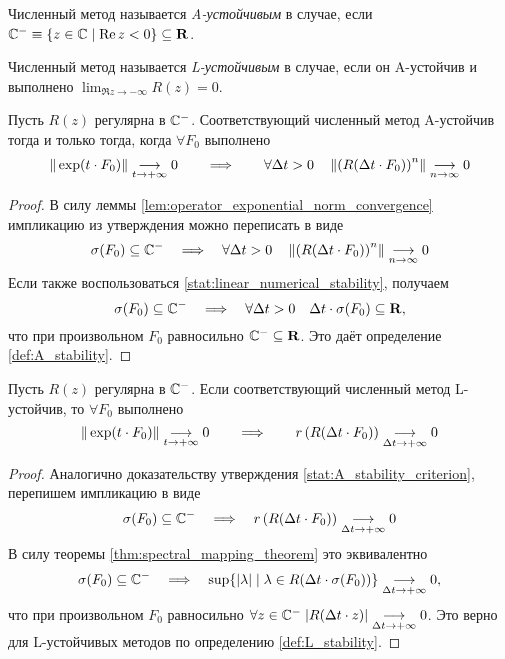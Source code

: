 \begin{definition}
    \label{def:A_stability}
    Численный метод называется \emph{A-устойчивым} в случае, если $ \mathbb{C}^- \equiv \{ z \in \mathbb{C} \mid \operatorname{Re} z < 0 \} \subseteq \mathbf{R} $.
\end{definition}

\begin{definition}
    \label{def:L_stability}
    Численный метод называется \emph{L-устойчивым} в случае, если он A-устойчив и выполнено $ \displaystyle\lim_{\Re z \to -\infty} R(z) = 0 $.
\end{definition}

\begin{statement}
    \label{stat:A_stability_criterion}
    Пусть $ R(z) $ регулярна в $ \mathbb{C}^- $.
    Соответствующий численный метод A-устойчив тогда и только тогда, когда $ \forall F_0 $ выполнено
    \[
        \| \exp(t \cdot F_0) \| \underset{t \to +\infty}{\longrightarrow} 0 \qquad \Longrightarrow \qquad \forall \Delta t > 0 \quad \left \| \left( R(\Delta t \cdot F_0) \right)^n \right\| \underset{n \to \infty}{\longrightarrow} 0
    \]
\end{statement}

\begin{proof}
    В силу леммы \ref{lem:operator_exponential_norm_convergence} импликацию из утверждения можно переписать в виде
    \[
        \sigma(F_0) \subseteq \mathbb{C}^- \quad \Longrightarrow \quad \forall \Delta t > 0 \quad \left \| \left( R(\Delta t \cdot F_0) \right)^n \right\| \underset{n \to \infty}{\longrightarrow} 0
    \]
    Если также воспользоваться \ref{stat:linear_numerical_stability}, получаем
    \[
        \sigma(F_0) \subseteq \mathbb{C}^- \quad \Longrightarrow \quad \forall \Delta t > 0 \quad \Delta t \cdot \sigma(F_0) \subseteq \mathbf{R},
    \]
    что при произвольном $ F_0 $ равносильно $ \mathbb{C}^- \subseteq \mathbf{R} $.
    Это даёт определение \ref{def:A_stability}.
\end{proof}

\begin{statement}
    \label{stat:L_stability_property}
    Пусть $ R(z) $ регулярна в $ \mathbb{C}^- $.
    Если соответствующий численный метод L-устойчив, то $ \forall F_0 $ выполнено
    \[
        \| \exp(t \cdot F_0) \| \underset{t \to +\infty}{\longrightarrow} 0 \qquad \Longrightarrow \qquad r \left( R(\Delta t \cdot F_0) \right) \underset{\Delta t \to +\infty}{\longrightarrow} 0
    \]
\end{statement}

\begin{proof}
    Аналогично доказательству утверждения \ref{stat:A_stability_criterion}, перепишем импликацию в виде
    \[
        \sigma(F_0) \subseteq \mathbb{C}^- \quad \Longrightarrow \quad r \left( R(\Delta t \cdot F_0) \right) \underset{\Delta t \to +\infty}{\longrightarrow} 0
    \]
    В силу теоремы \ref{thm:spectral_mapping_theorem} это эквивалентно
    \[
        \sigma(F_0) \subseteq \mathbb{C}^- \quad \Longrightarrow \quad \sup \{ |\lambda| \mid \lambda \in R(\Delta t \cdot \sigma(F_0)) \} \underset{\Delta t \to +\infty}{\longrightarrow} 0,
    \]
    что при произвольном $ F_0 $ равносильно $ \forall z \in \mathbb{C}^- \; | R(\Delta t \cdot z) | \underset{\Delta t \to +\infty}{\longrightarrow} 0 $.
    Это верно для L-устойчивых методов по определению \ref{def:L_stability}.
\end{proof}

